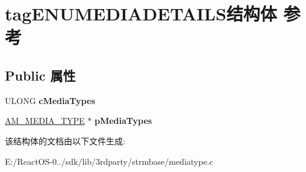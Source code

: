 \hypertarget{structtag_e_n_u_m_e_d_i_a_d_e_t_a_i_l_s}{}\section{tag\+E\+N\+U\+M\+E\+D\+I\+A\+D\+E\+T\+A\+I\+L\+S结构体 参考}
\label{structtag_e_n_u_m_e_d_i_a_d_e_t_a_i_l_s}
\subsection*{Public 属性}
\begin{DoxyCompactItemize}
\item 
\mbox{\label{structtag_e_n_u_m_e_d_i_a_d_e_t_a_i_l_s_a403e530aca87956711c886215c9b63a7}} 
U\+L\+O\+NG {\bfseries c\+Media\+Types}
\item 
\mbox{\label{structtag_e_n_u_m_e_d_i_a_d_e_t_a_i_l_s_ae3472953e42cc23115bfd1dd62c25556}} 
\hyperlink{struct_a_m___m_e_d_i_a___t_y_p_e}{A\+M\+\_\+\+M\+E\+D\+I\+A\+\_\+\+T\+Y\+PE} $\ast$ {\bfseries p\+Media\+Types}
\end{DoxyCompactItemize}


该结构体的文档由以下文件生成\+:\begin{DoxyCompactItemize}
\item 
E\+:/\+React\+O\+S-\/0../sdk/lib/3rdparty/strmbase/mediatype.\+c\end{DoxyCompactItemize}
